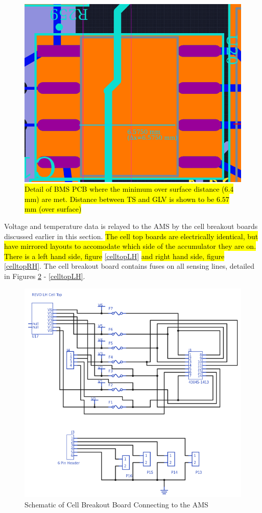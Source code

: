 \documentclass{article}
\DeclareRobustCommand{\hlr}[1]{{\sethlcolor{red}\hl{#1}}}
\begin{document}
            \begin{figure}[H]
                \centering
                \includegraphics[width=0.4 \textwidth]{bms_separation_detail}
                \caption{\hlr{Detail of BMS PCB where the minimum over surface distance (6.4 mm) are met. Distance between TS and GLV is shown to be $6.57$ mm (over surface)}}
                \label{creepage}
            \end{figure}

            Voltage and temperature data is relayed to the AMS by the cell breakout boards discussed earlier in this section. \hlr{The cell top boards are electrically identical, but have mirrored layouts to accomodate which side of the accumulator they are on. There is a left hand side, figure} \ref{celltopLH}\hlr{ and right hand side, figure} \ref{celltopRH}. The cell breakout board contains fuses on all sensing lines, detailed in Figures \ref{celltopschem} - \ref{celltopLH}.

            \begin{figure}[H]
                \centering
                \includegraphics[width = 0.8 \textwidth]{CellTopSchem}
                \caption{Schematic of Cell Breakout Board Connecting to the AMS}
                \label{celltopschem}
            \end{figure}
\end{document}
